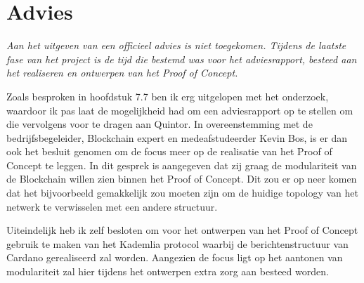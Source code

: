 \chapter{Advies}

\textit{Aan het uitgeven van een officieel advies is niet toegekomen. Tijdens de laatste fase van het project is de tijd die bestemd was voor het adviesrapport, besteed aan het realiseren en ontwerpen van het Proof of Concept.}

Zoals besproken in hoofdstuk 7.7 ben ik erg uitgelopen met het onderzoek, waardoor ik pas laat de mogelijkheid had om een adviesrapport op te stellen om die vervolgens voor te dragen aan Quintor. In overeenstemming met de bedrijfsbegeleider, Blockchain expert en medeafstudeerder Kevin Bos, is er dan ook het besluit genomen om de focus meer op de realisatie van het Proof of Concept te leggen. In dit gesprek is aangegeven dat zij graag de modulariteit van de Blockchain willen zien binnen het Proof of Concept. Dit zou er op neer komen dat het bijvoorbeeld gemakkelijk zou moeten zijn om de huidige topology van het netwerk te verwisselen met een andere structuur.

Uiteindelijk heb ik zelf besloten om voor het ontwerpen van het Proof of Concept gebruik te maken van het Kademlia protocol waarbij de berichtenstructuur van Cardano gerealiseerd zal worden. Aangezien de focus ligt op het aantonen van modulariteit zal hier tijdens het ontwerpen extra zorg aan besteed worden.